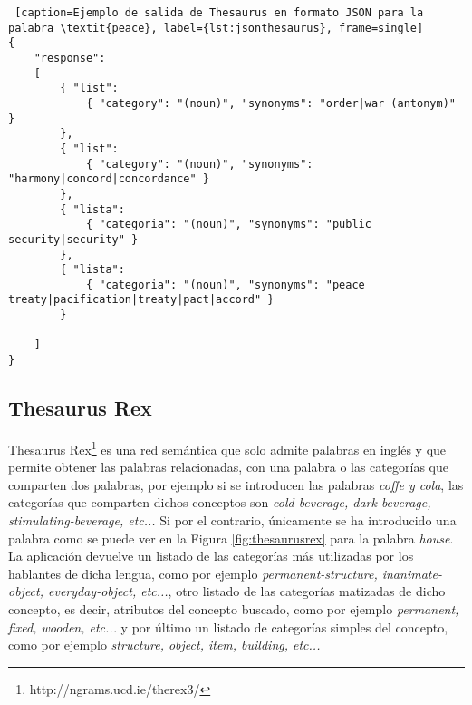 
\begin{lstlisting} [caption=Ejemplo de salida de Thesaurus en formato JSON para la palabra \textit{peace}, label={lst:jsonthesaurus}, frame=single]
{
	"response":
	[
		{ "list": 
			{ "category": "(noun)", "synonyms": "order|war (antonym)" }
		},
		{ "list": 
			{ "category": "(noun)", "synonyms": "harmony|concord|concordance" }
		},
		{ "lista": 
			{ "categoria": "(noun)", "synonyms": "public security|security" }
		},
		{ "lista": 
			{ "categoria": "(noun)", "synonyms": "peace treaty|pacification|treaty|pact|accord" }
		}
	
	]
}
\end{lstlisting}




\subsection{Thesaurus Rex}
\label{cap:subsec:thesaurusrex}

Thesaurus Rex\footnote{http://ngrams.ucd.ie/therex3/} es una red semántica que solo admite palabras en inglés y que permite obtener las palabras relacionadas, con una palabra o las categorías que comparten dos palabras, por ejemplo si se introducen las palabras \textit{coffe y cola}, las categorías que comparten dichos conceptos son \textit{cold-beverage, dark-beverage, stimulating-beverage, etc...}
Si por el contrario, únicamente se ha introducido una palabra como se puede ver en la Figura \ref{fig:thesaurusrex} para la palabra  \textit{house}. La aplicación devuelve un listado de las categorías más utilizadas por los hablantes de dicha lengua, como por ejemplo \textit{permanent-structure, inanimate-object, everyday-object, etc...},
 otro listado de las categorías matizadas de dicho concepto, es decir, atributos del concepto buscado, como por ejemplo \textit{permanent, fixed, wooden, etc...} y por último un listado de categorías simples del concepto, como por ejemplo \textit{structure, object, item, building, etc...}

